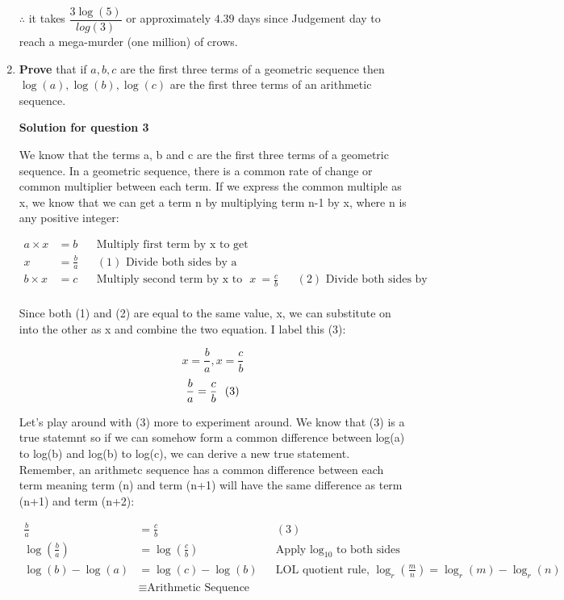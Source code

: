 \documentclass[12pt]{book}
\begin{document}
\begin{enumerate}
\begin{center}
    $\therefore$ it takes $\boxed{\dfrac{3\log(5)}{log(3)}}$ or approximately $\boxed{4.39}$ days since Judgement day 
    to reach a mega-murder (one million) of crows.
\end{center}

\newpage

\item \textbf{Prove} that if $a,b,c$ are the first three terms of a geometric sequence then $\log(a), \log(b), \log(c)$ are the first three terms of an arithmetic sequence.

\vspace{0.5cm}
\textbf{Solution for question 3}

\vspace{0.2cm}
We know that the terms a, b and c are the first three terms of a geometric 
sequence. In a geometric sequence, there is a common rate of change or common 
multiplier between each term. If we express the common multiple as x, we know that
we can get a term n by multiplying term n-1 by x, where n is any positive integer:

\begin{align*}
    a \times x &= b && \text{Multiply first term by x to get second term}\\
    x &= \frac{b}{a} && (1)\text{ Divide both sides by a} \\
    b \times x &= c && \text{Multiply second term by x to get third term}
    x &= \frac{c}{b} && (2)\text{ Divide both sides by b} \\
\end{align*}

Since both (1) and (2) are equal to the same value, x, we can 
substitute on into the other as x and combine the two equation. 
I label this (3):

$$x = \frac{b}{a}, x = \frac{c}{b}$$
$$\frac{b}{a} = \frac{c}{b} \text{\space \space (3)}$$

Let's play around with (3) more to experiment around. We know 
that (3) is a true statemnt so if we can somehow form a common 
difference between log(a) to log(b) and log(b) to log(c), we 
can derive a new true statement. Remember, an arithmetc sequence 
has a common difference between each term meaning term (n) and term (n+1) 
will have the same difference as term (n+1) and term (n+2):

\begin{align*}
    \frac{b}{a} &= \frac{c}{b} && (3) \\
    \log\left( \frac{b}{a} \right) &= \log\left( \frac{c}{b} \right) && \text{Apply } \log_{10} \text{ to both sides} \\
    \log(b) - \log(a) &= \log(c) - \log(b) && \text{LOL quotient rule, } \log_r\left( \frac{m}{n} \right) = \log_r(m) - \log_r(n) \\
    & \equiv \text{Arithmetic Sequence}
\end{align*}


\end{enumerate}
\end{document}
